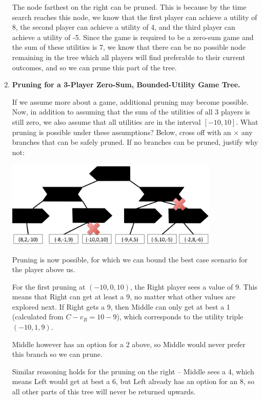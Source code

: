 \begin{enumerate}
{\color{red}
The node farthest on the right can be pruned.
This is because by the time search reaches this node, we know that the first player can achieve a utility of 8, the second player can achieve a utility of 4, and the third player can achieve a utility of -5.
Since the game is required to be a zero-sum game and the sum of these utilities is 7, we know that there can be no possible node remaining in the tree which all players will find preferable to their current outcomes, and so we can prune this part of the tree.
}


\item {\bf Pruning for a 3-Player Zero-Sum, Bounded-Utility Game Tree.}

If we assume more about a game, additional pruning may become possible.  Now, in addition to assuming that the sum of the utilities of
all 3 players is still zero, we also assume that all utilities are in the interval $[-10, 10]$.
What pruning is possible under these assumptions?  Below, cross off with an $\times$ any branches that can be safely pruned.   If no branches can be pruned, justify why not:

\begin{center}
    \includegraphics[width=4in]{figures/skeleton_solution}
\end{center}

{\color{red}
Pruning is now possible, for which we can bound the best case scenario for the player above us.

For the first pruning at $(-10,0,10)$, the Right player sees a value of 9. This means that Right can get at least a 9, no matter what other values are explored next. If Right gets a 9, then Middle can only get at best a 1 (calculated from $C - v_R = 10 - 9$), which corresponds to the utility triple $(-10,1,9)$.

Middle however has an option for a 2 above, so Middle would never prefer this branch so we can prune.

Similar reasoning holds for the pruning on the right -- Middle sees a 4, which means Left would get at best a 6, but Left already has an option for an 8, so all other parts of this tree will never be returned upwards.
    }

\end{enumerate}